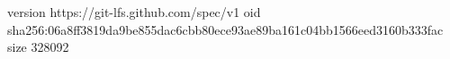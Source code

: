 version https://git-lfs.github.com/spec/v1
oid sha256:06a8ff3819da9be855dac6cbb80ece93ae89ba161c04bb1566eed3160b333fac
size 328092
